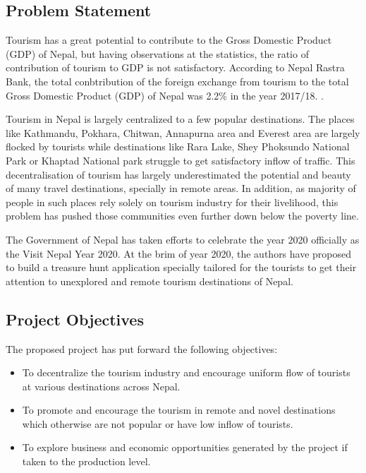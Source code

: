 \documentclass[12pt, a4paper, oneside]{article}
\begin{document}
\subsection{Problem Statement}
Tourism has a great potential to contribute to the Gross Domestic Product (GDP) of Nepal, but having observations at the statistics, the ratio of contribution of tourism to GDP is not satisfactory. According to Nepal Rastra Bank, the total conbtribution of the foreign exchange from tourism to the total Gross Domestic Product (GDP) of Nepal was 2.2\% in the year 2017/18. \cite{tourismstats}.

Tourism in Nepal is largely centralized to a few popular destinations. The places like Kathmandu, Pokhara, Chitwan, Annapurna area and Everest area are largely flocked by tourists while destinations like Rara Lake, Shey Phoksundo National Park or Khaptad National park struggle to get satisfactory inflow of traffic. This decentralisation of tourism has largely underestimated the potential and beauty of many travel destinations, specially in remote areas. In addition, as majority of people in such places rely solely on tourism industry for their livelihood, this problem has pushed those communities even further down below the poverty line.

The Government of Nepal has taken efforts to celebrate the year 2020 officially as the Visit Nepal Year 2020. At the brim of year 2020, the authors have proposed to build a treasure hunt application specially tailored for the tourists to get their attention to unexplored and remote tourism destinations of Nepal.

\subsection{Project Objectives}
The proposed project has put forward the following objectives:

\begin{itemize}
	\item To decentralize the tourism industry and encourage uniform flow of tourists at various destinations across Nepal.
	\item To promote and encourage the tourism in remote and novel destinations which otherwise are not popular or have low inflow of tourists.
	\item To explore business and economic opportunities generated by the project if taken to the production level.
\end{itemize}
\end{document}
